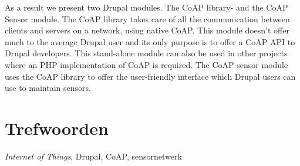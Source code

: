 {As a result we present two Drupal modules. The CoAP library- and the CoAP Sensor module. The CoAP library takes care of all the communication between clients and servers on a network, using native CoAP. This module doesn't offer much to the average Drupal user and its only purpose is to offer a CoAP API to Drupal developers. This stand-alone module can also be used in other projects where an PHP implementation of CoAP is required. The CoAP sensor module uses the CoAP library to offer the user-friendly interface which Drupal users can use to maintain sensors.
\section*{Trefwoorden}


\textit{Internet of Things}, Drupal, CoAP, sensornetwerk

}

\newpage %
